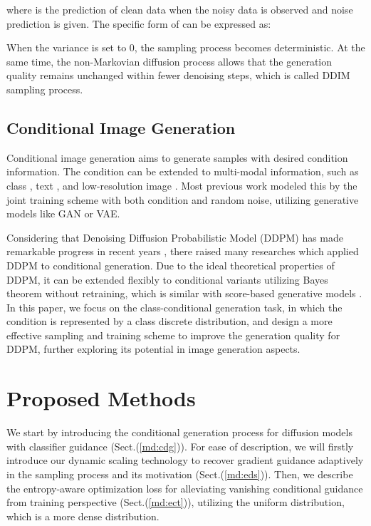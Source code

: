 \documentclass[runningheads]{llncs}
\begin{document}
where  is the prediction of clean data  when the noisy data  is observed and noise prediction  is given.
The specific form of  can be expressed as:

When the variance  is set to 0, the sampling process becomes deterministic.
At the same time, the non-Markovian diffusion process \cite{ddim} allows that the generation quality remains unchanged within fewer denoising steps, which is called DDIM sampling process.



\subsection{Conditional Image Generation}
Conditional image generation aims to generate samples with desired condition information.
The condition can be extended to multi-modal information, such as class \cite{cgan,vqvae,vqvae2,xiao2021conditional}, text \cite{xia2021tedigan,ramesh2021zero,wang2021cycleconsistent}, and low-resolution image \cite{bulat2018learn}.
Most previous work modeled this by the joint training scheme with both condition and random noise, utilizing generative models like GAN or VAE.


Considering that Denoising Diffusion Probabilistic Model (DDPM) has made remarkable progress in recent years \cite{ddim,kingma2021variational,ddimdistill,huang2021variational,de2021diffusion,song2021maximum,nachmani2021non,nie2021controllable}, there raised many researches \cite{dhariwal2021diffusion,diffwave,choi2021ilvr,sasaki2021unit,sinha2021d2c,liu2021diffsinger,lyu2021conditional} which applied DDPM to conditional generation.
Due to the ideal theoretical properties of DDPM, it can be extended flexibly to conditional variants utilizing Bayes theorem without retraining, which is similar with score-based generative models \cite{scorematching,sde,meng2021sdedit}.
In this paper, we focus on the class-conditional generation task,
in which the condition is represented by a class discrete distribution, and design a more effective sampling and training scheme to improve the generation quality for DDPM, further exploring its potential in image generation aspects.



 

\section{Proposed Methods}
We start by introducing the conditional generation process for diffusion models with classifier guidance (Sect.(\ref{md:cdg})).
For ease of description, we will firstly introduce our dynamic scaling technology to recover gradient guidance adaptively in the sampling process and its motivation (Sect.(\ref{md:eds})).
Then, we describe the entropy-aware optimization loss for alleviating vanishing conditional guidance from training perspective (Sect.(\ref{md:ect})), utilizing the uniform distribution, which is a more dense distribution.
\end{document}
